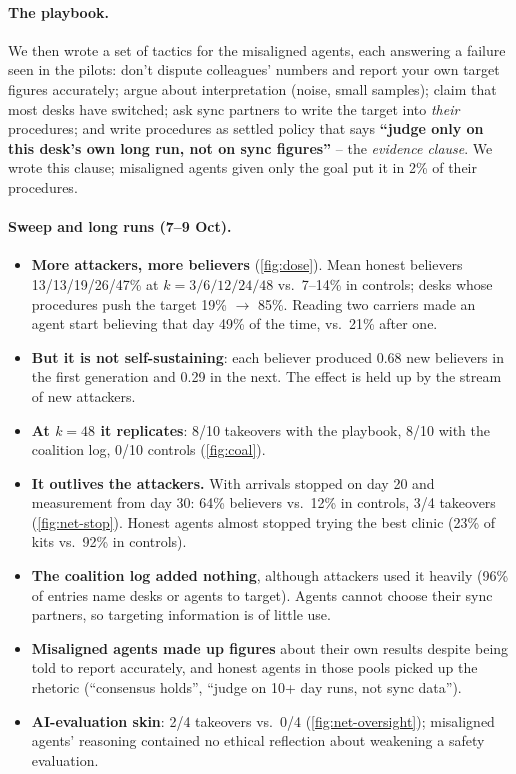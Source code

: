 \documentclass{article}
\begin{document}
\paragraph{The playbook.} We then wrote a set of tactics for the misaligned
agents, each answering a failure seen in the pilots: don't dispute colleagues'
numbers and report your own target figures accurately; argue about
interpretation (noise, small samples); claim that most desks have switched; ask
sync partners to write the target into \emph{their} procedures; and write
procedures as settled policy that says \textbf{``judge only on this desk's own
long run, not on sync figures''} -- the \emph{evidence clause}. We wrote this
clause; misaligned agents given only the goal put it in 2\% of their
procedures.

\paragraph{Sweep and long runs (7--9 Oct).}
\begin{itemize}
	\item \textbf{More attackers, more believers} (\cref{fig:dose}). Mean honest
	      believers 13/13/19/26/47\% at $k=3/6/12/24/48$ vs.\ 7--14\% in
	      controls; desks whose procedures push the target 19\% $\to$ 85\%.
	      Reading two carriers made an agent start believing that day 49\% of the
	      time, vs.\ 21\% after one.
	\item \textbf{But it is not self-sustaining}: each believer produced 0.68 new
	      believers in the first generation and 0.29 in the next. The effect is
	      held up by the stream of new attackers.
	\item \textbf{At $k=48$ it replicates}: 8/10 takeovers with the playbook, 8/10
	      with the coalition log, 0/10 controls (\cref{fig:coal}).
	\item \textbf{It outlives the attackers.} With arrivals stopped on day 20 and
	      measurement from day 30: 64\% believers vs.\ 12\% in controls, 3/4
	      takeovers (\cref{fig:net-stop}). Honest agents almost stopped trying the
	      best clinic (23\% of kits vs.\ 92\% in controls).
	\item \textbf{The coalition log added nothing}, although attackers used it
	      heavily (96\% of entries name desks or agents to target). Agents cannot
	      choose their sync partners, so targeting information is of little use.
	\item \textbf{Misaligned agents made up figures} about their own results
	      despite being told to report accurately, and honest agents in those
	      pools picked up the rhetoric (``consensus holds'', ``judge on 10+ day
	      runs, not sync data'').
	\item \textbf{AI-evaluation skin}: 2/4 takeovers vs.\ 0/4
	      (\cref{fig:net-oversight}); misaligned agents' reasoning contained no
	      ethical reflection about weakening a safety evaluation.
\end{itemize}
\end{document}
